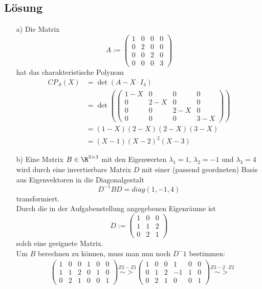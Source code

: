 \subsection*{L\"osung}
\begin{itemize}
\item[a)] Die Matrix 
$$
A:=\begin{pmatrix}1 & 0&0&0 \\ 0& 2 & 0&0 \\ 0& 0&2&0 \\ 0&0&0&3 \end{pmatrix}
$$
hat das charakteristische Polynom 
\begin{align*}
CP_A(X)&=\det(A-X\cdot I_4)\\
&=\det(\begin{pmatrix}1 -X& 0&0&0 \\ 0& 2-X & 0&0 \\ 0& 0&2-X&0 \\ 0&0&0&3-X \end{pmatrix})\\
&=(1-X)(2-X)(2-X)(3-X)\\
&=(X-1)(X-2)^2(X-3)
\end{align*}
\item[b)] Eine Matrix $B \in \R^{3\times 3}$ mit den Eigenwerten $\lambda_1= 1$, $\lambda_2=-1$ und $\lambda_3=4$ wird durch eine invertierbare Matrix $D$ mit einer (passend geordneten) Basis aus Eigenvektoren in die Diagonalgestalt
$$
D^{-1}BD=diag(1,-1,4)
$$
transformiert.\\
Durch die in der Aufgabenstellung angegebenen Eigenräume ist 
$$
D:=\begin{pmatrix} 1 & 0 & 0 \\ 1 & 1 & 2 \\ 0 & 2 & 1\end{pmatrix}
$$
solch eine geeignete Matrix.\\
Um $B$ berechnen zu können, muss man nun noch $D^-1$ bestimmen:
\begin{align*}
&\left(\begin{array}{ccc|ccc}
1 & 0 & 0 &1&0&0\\ 1 & 1 & 2 &0&1&0\\ 0 & 2 & 1&0&0&1
\end{array}\right)\stackrel{Z2-Z1}{\sim >}
\left(\begin{array}{ccc|ccc}
1 & 0 & 0 &1&0&0\\ 0 & 1 & 2 &-1&1&0\\ 0 & 2 & 1&0&0&1
\end{array}\right)\stackrel{Z3-2\cdot Z2}{\sim >}

\end{align*}
\end{itemize}

